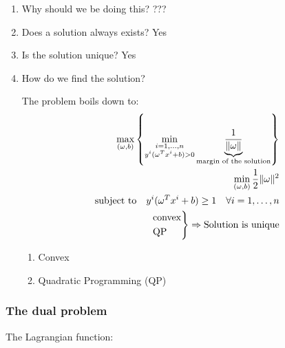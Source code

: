 \begin{enumerate}
	\item Why should we be doing this? ???
	\item Does a solution always exists? Yes
	\item Is the solution unique? Yes
	\item How do we find the solution?

	      The problem boils down to:
	      \begin{align*}
		      \max_{(\omega, b)}
		      \left\{
		      \min_{\substack{i=1,\dots, n                                                  \\ y^i(\omega^Tx^i + b) > 0}}
		      \underbrace{\frac{1}{\lVert\omega\rVert}}_{\text{margin of the solution}}
		      \right\}                                                                      \\
		      \min_{(\omega, b)} \frac{1}{2}\lVert\omega\rVert^2                            \\
		      \text{subject to} \quad y^i(\omega^Tx^i + b) \geq 1 \quad \forall i=1,\dots,n \\
		      \begin{rcases*}
			      \text{convex} \\
			      \text{QP}     \\
		      \end{rcases*} \Rightarrow \text{Solution is unique}
	      \end{align*}

	      \begin{enumerate}
		      \item Convex
		      \item Quadratic Programming (QP)
	      \end{enumerate}

\end{enumerate}

\subsubsection{The dual problem}

The Lagrangian function:

